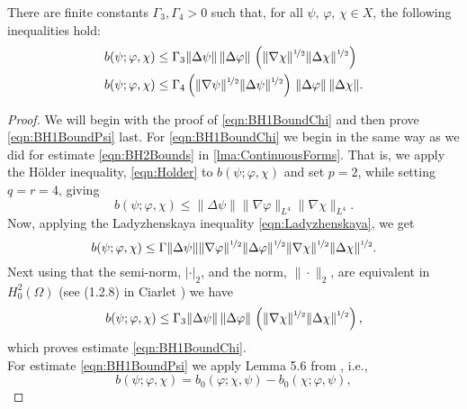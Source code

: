 \begin{lemma} \label{lma:BH1Bound}
  There are finite constants $\Gamma_3,\Gamma_4>0$ such that, for all
  $\psi,\, \varphi,\, \chi \in X$, the following inequalities hold:
  \begin{align}
    b(\psi;\varphi,\chi) &\le \Gamma_3 \|\Delta \psi\|\, \|\Delta \varphi\|\,
      \left(\|\nabla \chi\|^{\nicefrac{1}{2}}
      \|\Delta \chi\|^{\nicefrac{1}{2}}\right) \label{eqn:BH1BoundChi} \\
    b(\psi;\varphi,\chi) &\le \Gamma_4 \left(\|\nabla \psi\|^{\nicefrac{1}{2}}
      \|\Delta \psi\|^{\nicefrac{1}{2}}\right)\,
      \|\Delta \varphi\|\, \|\Delta \chi\|. \label{eqn:BH1BoundPsi}
  \end{align}
\end{lemma}
\begin{proof}
  We will begin with the proof of \eqref{eqn:BH1BoundChi} and then prove
  \eqref{eqn:BH1BoundPsi} last. For \eqref{eqn:BH1BoundChi} we begin in the same
  way as we did for estimate \eqref{eqn:BH2Bounds} in \autoref{lma:ContinuousForms}.
  That is, we apply the H\"older inequality, \eqref{eqn:Holder} to $b(\psi;
  \varphi, \chi)$ and set $p=2$, while setting $q=r=4$, giving
  \begin{equation*}
    b(\psi;\varphi,\chi) \le \|\Delta \psi\| \|\nabla \varphi\|_{L^4} \|\nabla
      \chi\|_{L^4}.
  \end{equation*}
  Now, applying the Ladyzhenskaya inequality \eqref{eqn:Ladyzhenskaya}, we get
  \begin{equation*}
    b(\psi;\varphi,\chi) \le \Gamma \|\Delta \psi\|
      \|\nabla \varphi\|^{\nicefrac{1}{2}} \|\Delta \varphi\|^{\nicefrac{1}{2}}
      \|\nabla \chi\|^{\nicefrac{1}{2}} \|\Delta \chi\|^{\nicefrac{1}{2}}.
  \end{equation*}
  Next using that the semi-norm, $|\cdot|_2$, and the norm, $\|\cdot\|_2$, are
  equivalent in $H^2_0(\Omega)$ (see (1.2.8) in Ciarlet \cite{Ciarlet}) we have
  \begin{equation*}
    b(\psi;\varphi,\chi) \le \Gamma_3 \|\Delta \psi\|\, \|\Delta \varphi\|\,
      \left(\|\nabla \chi\|^{\nicefrac{1}{2}}
      \|\Delta \chi\|^{\nicefrac{1}{2}}\right),
  \end{equation*}
  which proves estimate \eqref{eqn:BH1BoundChi}. \\
  For estimate \eqref{eqn:BH1BoundPsi} we apply Lemma 5.6 from \cite{Fairag98},
  i.e.,
  \begin{equation*}
    b(\psi; \varphi, \chi) = b_0(\varphi; \chi, \psi) - b_0(\chi; \varphi, \psi),

\end{equation*}
\end{proof}
